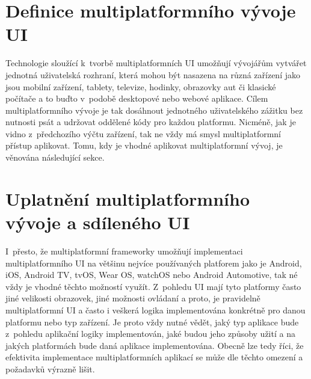 \begin{sloppypar}
\section{Definice multiplatformního vývoje UI}
Technologie sloužící k~tvorbě multiplatformních UI umožňují vývojářům vytvářet jednotná uživatelská rozhraní, 
která mohou být nasazena na různá zařízení jako jsou mobilní zařízení, tablety, televize, hodinky, obrazovky aut či 
klasické počítače a to buďto v~podobě desktopové nebo webové aplikace. Cílem multiplatformního vývoje je tak dosáhnout jednotného 
uživatelského zážitku bez nutnosti psát a udržovat oddělené kódy pro každou platformu. Nicméně, jak je vidno z~předchozího výčtu zařízení, 
tak ne vždy má smysl multiplatformní přístup aplikovat. Tomu, kdy je vhodné aplikovat multiplatformní vývoj, je věnována následující sekce.  
\end{sloppypar}


\section{Uplatnění multiplatformního vývoje a sdíleného UI}
I~přesto, že multiplatformní frameworky umožňují implementaci multiplatformního UI na většinu nejvíce používaných platforem jako je Android, iOS,
Android TV, tvOS, Wear OS, watchOS nebo Android Automotive, tak né vždy je vhodné těchto možností využít. Z~pohledu UI mají tyto platformy často jiné 
velikosti obrazovek, jiné možnosti ovládaní a proto, je pravidelně multiplatformní UI a často i veškerá logika implementována konkrétně pro danou platformu
nebo typ zařízení. Je proto vždy nutné vědět, jaký typ aplikace bude z~pohledu aplikační logiky implementován, jaké budou jeho způsoby užití a na jakých 
platformách bude daná aplikace implementována.
Obecně lze tedy říci, že efektivita implementace multiplatformních aplikací se může dle těchto omezení a požadavků výrazně lišit.


